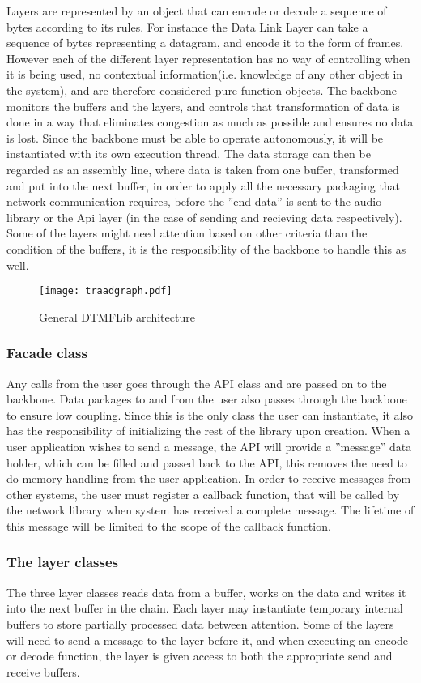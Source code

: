 Layers are represented by an object that can encode or decode a sequence of bytes according to its rules. For instance the Data Link Layer can take a sequence of bytes representing a datagram, and encode it to the form of frames.
However each of the different layer representation has no way of controlling when it is being used, no contextual information(i.e. knowledge of any other object in the system), and are therefore considered pure function objects.
The backbone monitors the buffers and the layers, and controls that transformation of data is done in a way that eliminates congestion as much as possible and ensures no data is lost. Since the backbone must be able to operate autonomously, it will be instantiated with its own execution thread. The data storage can then be regarded as an assembly line, where data is taken from one buffer, transformed and put into the next buffer, in order to apply all the necessary packaging that network communication requires, before the ''end data'' is sent to the audio library or the Api layer (in the case of sending and recieving data respectively).
Some of the layers might need attention based on other criteria than the condition of the buffers, it is the responsibility of the backbone to handle this as well.

\begin{figure}[htb]
	\begin{center}
	\texttt{[image: traadgraph.pdf]}
	\caption{General DTMFLib architecture}
	\label{fig:general_architecture}	
	\end{center}
\end{figure}

\subsubsection{Facade class}
Any calls from the user goes through the API class and are passed on to the backbone. Data packages to and from the user also passes through the backbone to ensure low coupling. Since this is the only class the user can instantiate, it also has the responsibility of initializing the rest of the library upon creation.
When a user application wishes to send a message, the API will provide a ''message'' data holder, which can be filled and passed back to the API, this removes the need to do memory handling from the user application.
In order to receive messages from other systems, the user must register a callback function, that will be called by the network library when system has received a complete message. The lifetime of this message will be limited to the scope of the callback function.

\subsubsection{The layer classes}
The three layer classes reads data from a buffer, works on the data and writes it into the next buffer in the chain. Each layer may instantiate temporary internal buffers to store partially processed data between attention. Some of the layers will need to send a message to the layer before it, and when executing an encode or decode function, the layer is given access to both the appropriate send and receive buffers.


